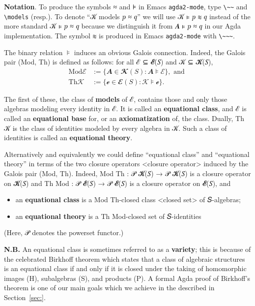 \documentclass[a4paper,USenglish,cleveref,autoref,thm-restate]{lipics-v2019}
\begin{document}
\noindent \textbf{Notation}. To produce the symbols ≈ and ⊧ in Emacs \texttt{agda2-mode}, type \texttt{\textbackslash{}\textasciitilde{}\textasciitilde{}} and \texttt{\textbackslash{}models} (resp.). To denote ``𝒦 models 𝑝 ≈ 𝑞'' we will use 𝒦 ⊧ 𝑝 ≋ 𝑞 instead of the more standard 𝒦 ⊧ 𝑝 ≈ 𝑞 because we distinguish it from 𝑨 ⊧ 𝑝 ≈ 𝑞 in our Agda implementation. The symbol ≋ is produced in Emacs \texttt{agda2-mode} with \texttt{\textbackslash{}\textasciitilde{}\textasciitilde{}\textasciitilde{}}.

The binary relation \(⊧\) induces an obvious Galois connection. Indeed, the Galois pair (Mod, Th) is defined as follows: for all ℰ ⊆ 𝓔(𝑆) and 𝒦 ⊆ 𝓚(𝑆),
\begin{align*}
\mathrm{Mod} ℰ &:= \{ 𝑨 ∈ 𝓚(𝑆) : 𝑨 ⊧ ℰ \}, \text{ and }\\
\mathrm{Th} 𝒦 &:= \{ℯ ∈ 𝓔(𝑆) : 𝒦 ⊧ ℯ \}.
\end{align*}

The first of these, the class of \textbf{models} of ℰ, contains those and only those algebras modeling every identity in ℰ. It is called an \textbf{equational class}, and ℰ is called an \textbf{equational base} for, or an \textbf{axiomatization} of, the class. Dually, Th 𝒦 is the class of identities modeled by every algebra in 𝒦. Such a class of identities is called an \textbf{equational theory}.

Alternatively and equivalently we could define ``equational class'' and ``equational theory'' in terms of the two
closure operators \textless{}closure operator\textgreater{} induced by the Galois pair (Mod, Th). Indeed, Mod Th : 𝒫 𝓚(𝑆) → 𝒫 𝓚(𝑆) is a closure operator on 𝓚(𝑆) and Th Mod : 𝒫 𝓔(𝑆) → 𝒫 𝓔(𝑆) is a closure operator on 𝓔(𝑆), and

\begin{itemize}
\item an \textbf{equational class} is a Mod Th-closed class \textless{}closed set\textgreater{} of 𝑆-algebras;
\item an \textbf{equational theory} is a Th Mod-closed set of 𝑆-identities
\end{itemize}
(Here, 𝒫 denotes the powerset functor.)

\noindent \textbf{N.B.} An equational class is sometimes referred to as a \textbf{variety}; this is because of the celebrated Birkhoff theorem which states that a class of algebraic structures is an equational class if and only if it is closed under the taking of homomorphic images (H), subalgebras (S), and products (P). A formal Agda proof of Birkhoff's theorem is one of our main goals which we achieve in the \birkhoffmodule described in Section~\ref{sec:}.
\end{document}
